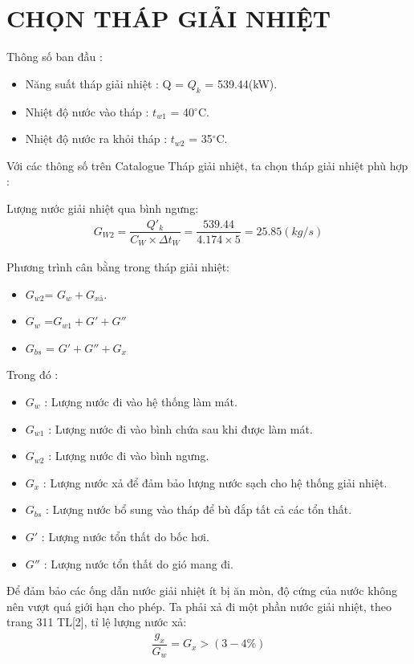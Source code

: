 \section{CHỌN THÁP GIẢI NHIỆT}
Thông số ban đầu :
\begin{itemize}
	\item Năng suất tháp giải nhiệt : Q = $ Q_{k}$ = 539.44(kW).
	\item Nhiệt độ nước vào tháp : $t_{w1}$ = 40$^{\circ}$C.
	\item Nhiệt độ nước ra khỏi tháp : $t_{w2}$ = 35$^{\circ}$C.
\end{itemize}

Với các thông số trên Catalogue Tháp giải nhiệt, ta chọn tháp giải nhiệt phù hợp : 

Lượng nước giải nhiệt qua bình ngưng:
\begin{equation*}
	\begin{split}
		G_{W2} = \dfrac{Q'_{k}}{C_{W} \times \Delta t_{W}}= \dfrac{539.44}{4.174 \times 5}=25.85(kg/s)
	\end{split}
\end{equation*}

Phương trình cân bằng trong tháp giải nhiệt:
\begin{itemize}
	\item $G_{w2}$= $G_{w} + G_{xả}$.
	\item $G_{w}$ =$ G_{w1} + G' + G''$
	\item $G_{bs}$ = $G' + G'' + G_{x}$
\end{itemize}

Trong đó :
\begin{itemize}
	\item $G_{w}$ : Lượng nước đi vào hệ thống làm mát.
	\item $G_{w1}$ : Lượng nước đi vào bình chứa sau khi được làm mát.
	\item $G_{w2}$ : Lượng nước đi vào bình ngưng.
	\item $G_{x}$ : Lượng nước xả để đảm bảo lượng nước sạch cho hệ thống giải nhiệt.
	\item $G_{bs}$ : Lượng nước bổ sung vào tháp để bù đắp tất cả các tổn thất.
	\item $G'$ : Lượng nước tổn thất do bốc hơi.
	\item $G''$ : Lượng nước tổn thất do gió mang đi.
\end{itemize}

Để đảm bảo các ống dẫn nước giải nhiệt ít bị ăn mòn, độ cứng của nước không nên vượt quá giới hạn cho phép. Ta phải xả đi một phần nước giải nhiệt, theo trang 311 TL[2], tỉ lệ lượng nước xả:
\begin{equation*}
  \begin{split}
  	\dfrac{g_{x}}{G_{w}} = G_{x} > (3 - 4 \% )
  \end{split}	
\end{equation*}

